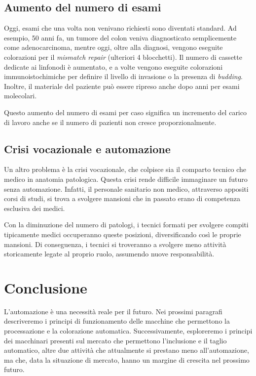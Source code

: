 \subsection{Aumento del numero di esami}

Oggi, esami che una volta non venivano richiesti sono diventati standard. Ad esempio, 50 anni fa, un tumore del colon veniva diagnosticato semplicemente come adenocarcinoma, mentre oggi, oltre alla diagnosi, vengono eseguite colorazioni per il \textit{mismatch repair} (ulteriori 4 blocchetti). Il numero di cassette dedicate ai linfonodi è aumentato, e a volte vengono eseguite colorazioni immunoistochimiche per definire il livello di invasione o la presenza di \textit{budding}. Inoltre, il materiale del paziente può essere ripreso anche dopo anni per esami molecolari.

Questo aumento del numero di esami per caso significa un incremento del carico di lavoro anche se il numero di pazienti non cresce proporzionalmente.

\subsection{Crisi vocazionale e automazione}

Un altro problema è la crisi vocazionale, che colpisce sia il comparto tecnico che medico in anatomia patologica. Questa crisi rende difficile immaginare un futuro senza automazione. Infatti, il personale sanitario non medico, attraverso appositi corsi di studi, si trova a svolgere mansioni che in passato erano di competenza esclusiva dei medici. 

Con la diminuzione del numero di patologi, i tecnici formati per svolgere compiti tipicamente medici occuperanno queste posizioni, diversificando così le proprie mansioni. Di conseguenza, i tecnici si troveranno a svolgere meno attività storicamente legate al proprio ruolo, assumendo nuove responsabilità.

\section{Conclusione}

L'automazione è una necessità reale per il futuro. Nei prossimi paragrafi descriveremo i principi di funzionamento delle macchine che permettono la processazione e la colorazione automatica. Successivamente, esploreremo i principi dei macchinari presenti sul mercato che permettono l'inclusione e il taglio automatico, altre due attività che attualmente si prestano meno all'automazione, ma che, data la situazione di mercato, hanno un margine di crescita nel prossimo futuro.
